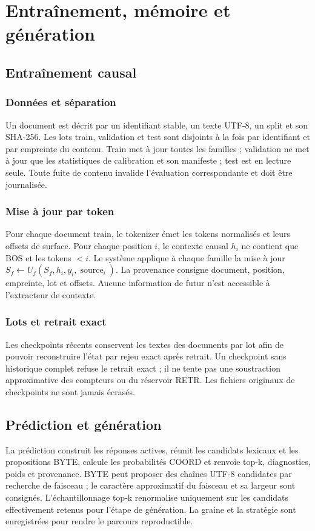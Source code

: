 \documentclass[11pt,a4paper,oneside,openany]{book}
\begin{document}
\part{Entraînement, mémoire et génération}
\chapter{Entraînement causal}
\section{Données et séparation}
Un document est décrit par un identifiant stable, un texte UTF-8, un split et son SHA-256. Les lots train, validation et test sont disjoints à la fois par identifiant et par empreinte du contenu. Train met à jour toutes les familles ; validation ne met à jour que les statistiques de calibration et son manifeste ; test est en lecture seule. Toute fuite de contenu invalide l'évaluation correspondante et doit être journalisée.

\section{Mise à jour par token}
Pour chaque document train, le tokenizer émet les tokens normalisés et leurs offsets de surface. Pour chaque position $i$, le contexte causal $h_i$ ne contient que BOS et les tokens $<i$. Le système applique à chaque famille la mise à jour $S_f\leftarrow U_f(S_f,h_i,y_i,\operatorname{source}_i)$. La provenance consigne document, position, empreinte, lot et offsets. Aucune information de futur n'est accessible à l'extracteur de contexte.

\section{Lots et retrait exact}
Les checkpoints récents conservent les textes des documents par lot afin de pouvoir reconstruire l'état par rejeu exact après retrait. Un checkpoint sans historique complet refuse le retrait exact ; il ne tente pas une soustraction approximative des compteurs ou du réservoir RETR. Les fichiers originaux de checkpoints ne sont jamais écrasés.

\chapter{Prédiction et génération}
La prédiction construit les réponses actives, réunit les candidats lexicaux et les propositions BYTE, calcule les probabilités COORD et renvoie top-k, diagnostics, poids et provenance. BYTE peut proposer des chaînes UTF-8 candidates par recherche de faisceau ; le caractère approximatif du faisceau et sa largeur sont consignés. L'échantillonnage top-k renormalise uniquement sur les candidats effectivement retenus pour l'étape de génération. La graine et la stratégie sont enregistrées pour rendre le parcours reproductible.
\end{document}
